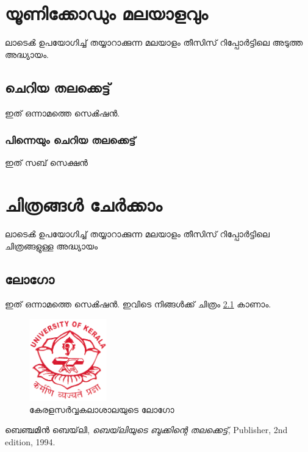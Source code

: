 \documentclass[11pt]{report}
\begin{document}
\chapter{യൂണിക്കോഡും മലയാളവും}
ലാടെൿ ഉപയോഗിച്ച് തയ്യാറാക്കുന്ന മലയാളം തീസിസ് റിപ്പോർട്ടിലെ അടുത്ത അദ്ധ്യായം.

\section{ചെറിയ തലക്കെട്ട്}

ഇത് ഒന്നാമത്തെ സെൿഷൻ.

\subsection{പിന്നെയും ചെറിയ തലക്കെട്ട്}
ഇത് സബ് സെക്ഷൻ


\chapter{ചിത്രങ്ങൾ ചേർക്കാം}
ലാടെൿ ഉപയോഗിച്ച് തയ്യാറാക്കുന്ന മലയാളം തീസിസ് റിപ്പോർട്ടിലെ ചിത്രങ്ങളുള്ള അദ്ധ്യായം

\section{ലോഗോ}

ഇത് ഒന്നാമത്തെ സെൿഷൻ. ഇവിടെ നിങ്ങൾക്ക് ചിത്രം \ref{logo} കാണാം.

\begin{figure}
\center
\includegraphics[width=0.3\textwidth]{./contents/logo.png}
\caption{കേരളസർവ്വകലാശാലയുടെ ലോഗോ}
\label{logo}
\end{figure}



\begin{thebibliography}{9}

  ബെഞ്ചമിൻ ബെയ്‌ലി,
  \textit{ബെയ്‌ലിയുടെ ബുക്കിന്റെ തലക്കെട്ട്},
  Publisher,
  2nd edition,
  1994.

\end{thebibliography}
\end{document}
